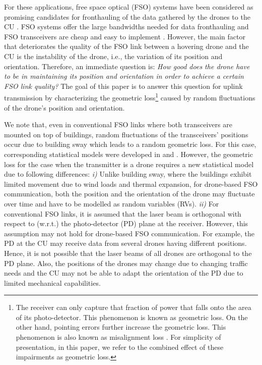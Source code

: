 \documentclass[conference]{IEEEtran}
\begin{document}
For these applications, free space optical (FSO) systems have been considered as promising candidates for fronthauling of the data gathered by the drones to the CU \cite{Alouini_Drone}. FSO systems offer the large bandwidths needed for data fronthauling and FSO transceivers are cheap and easy to implement \cite{Optic_Tbit,MyTCOM}. However, the main factor that deteriorates the quality of the FSO link between a hovering drone and the CU is the instability of the drone, i.e., the variation of its position and orientation. Therefore, an immediate question is: \textit{How good does the drone have to be in maintaining its position and orientation in order to achieve a certain FSO link quality?} The goal of this paper is to answer this question for uplink transmission by characterizing the geometric loss\footnote{\label{Ftn:Loss} The receiver can only capture that fraction of  power that falls onto the area of its  photo-detector. This phenomenon is known as geometric loss. On the other hand, pointing errors further increase the geometric loss. This phenomenon is also known as misalignment loss \cite{Steve_pointing_error}. For simplicity of presentation,  in this paper, we refer to the combined effect of these impairments as geometric loss. } caused by random fluctuations of the drone's position and orientation. 

We note that,  even in conventional FSO links where both transceivers are mounted on top of buildings, random fluctuations of the transceivers' positions occur due to building sway which leads to a random geometric loss. For this case, corresponding statistical models were developed in \cite{Steve_pointing_error} and \cite{Alouini_Pointing}. However, the geometric loss for the case when the transmitter is a drone requires a new statistical model due to following differences:
\textit{i)} Unlike building sway, where the buildings exhibit limited movement due to wind loads and thermal expansion, for drone-based FSO communication, both the position and the orientation of the drone may fluctuate over time and have to be modelled as random variables (RVs).
\textit{ii)} For conventional FSO links, it is assumed that the laser beam is orthogonal with respect to (w.r.t.) the photo-detector (PD) plane at the receiver. However, this assumption may not hold for drone-based FSO communication. For example, the PD at the CU may receive data from several drones having different positions. Hence, it is not possible that the laser beams of all drones are orthogonal to the PD plane. Also, the positions of the drones may change due to changing traffic needs and the CU may not be able to adapt the orientation of the PD due to limited mechanical capabilities.
\end{document}
